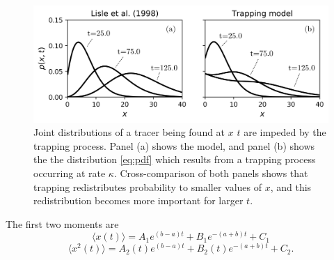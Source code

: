 \documentclass[]{agujournal2018}
\newcommand\be{\begin{equation}}
\newcommand\ee{\end{equation}}
\newcommand\bra{\langle}
\newcommand\ket{\rangle}
\begin{document}
\begin{figure}
	\includegraphics[width=\linewidth,keepaspectratio]{./figures/pdf-plot-edit.png}
	\caption{Joint distributions of a tracer being found at $x$ $t$ are impeded by the trapping process. Panel (a) shows the \citet{Lisle1998} model, and panel (b) shows the the distribution \ref{eq:pdf} which results from a trapping process occurring at rate $\kappa$. Cross-comparison of both panels shows that trapping redistributes probability to smaller values of $x$, and this redistribution becomes more important for larger $t$.}
	\label{fig:pdfs}
\end{figure}
\noindent The first two moments are
\be \bra x(t) \ket = A_1 e^{(b-a)t}+B_1e^{-(a+b)t}+C_1 \label{eq:mean}\ee
\be \bra x^2(t) \ket = A_2(t)e^{(b-a)t}+B_2(t)e^{-(a+b)t}+C_2. \label{eq:second}\ee
\end{document}
